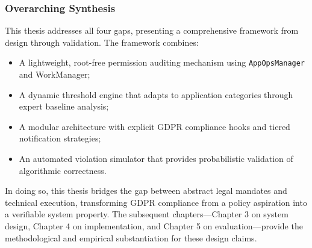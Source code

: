 \subsubsection{Overarching Synthesis}

This thesis addresses all four gaps, presenting a comprehensive framework from design through validation. The framework combines:
\begin{itemize}
    \item A lightweight, root-free permission auditing mechanism using \texttt{AppOpsManager} and WorkManager;
    \item A dynamic threshold engine that adapts to application categories through expert baseline analysis;
    \item A modular architecture with explicit GDPR compliance hooks and tiered notification strategies;
    \item An automated violation simulator that provides probabilistic validation of algorithmic correctness.
\end{itemize}

In doing so, this thesis bridges the gap between abstract legal mandates and technical execution, transforming GDPR compliance from a policy aspiration into a verifiable system property. The subsequent chapters—Chapter 3 on system design, Chapter 4 on implementation, and Chapter 5 on evaluation—provide the methodological and empirical substantiation for these design claims.

